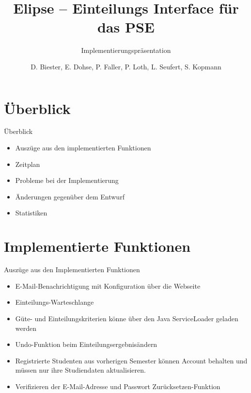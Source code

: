 \documentclass[18pt]{beamer}
\title[Elipse]{Elipse -- Einteilungs Interface für das PSE}
\subtitle{Implementierungspräsentation}
\author{D. Biester, E. Dohse, P. Faller, P. Loth, L. Seufert, S. Kopmann}
\institute{IPD Snelting}
\begin{document}

\begin{frame}
\titlepage
\end{frame}
\section{Überblick}
\begin{frame}{Überblick}
\begin{itemize}
  \item Auszüge aus den implementierten Funktionen
  \item Zeitplan
  \item Probleme bei der Implementierung
  \item Änderungen gegenüber dem Entwurf
  \item Statistiken
\end{itemize}
\end{frame}

\section{Implementierte Funktionen}
\begin{frame}{Auszüge aus den Implementierten Funktionen}
\begin{itemize}
  \item E-Mail-Benachrichtigung mit Konfiguration über die Webseite
  \item Einteilungs-Warteschlange
  \item Güte- und Einteilungskriterien könne über den Java ServiceLoader geladen werden
  \item Undo-Funktion beim Einteilungsergebnisändern
  \item Registrierte Studenten aus vorherigen Semester können Account behalten und müssen nur ihre Studiendaten aktualisieren.
  \item Verifizieren der E-Mail-Adresse und Passwort Zurücksetzen-Funktion
\end{itemize}
\end{frame}

\end{document}
